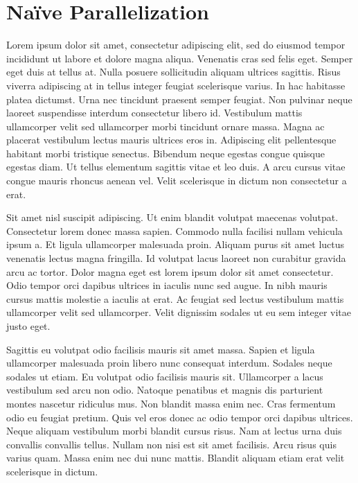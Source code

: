 \documentclass[12pt]{article}
\begin{document}
\newpage


\section{Naïve Parallelization}
Lorem ipsum dolor sit amet, consectetur adipiscing elit, sed do eiusmod tempor incididunt ut labore et dolore magna aliqua. Venenatis cras sed felis eget. Semper eget duis at tellus at. Nulla posuere sollicitudin aliquam ultrices sagittis. Risus viverra adipiscing at in tellus integer feugiat scelerisque varius. In hac habitasse platea dictumst. Urna nec tincidunt praesent semper feugiat. Non pulvinar neque laoreet suspendisse interdum consectetur libero id. Vestibulum mattis ullamcorper velit sed ullamcorper morbi tincidunt ornare massa. Magna ac placerat vestibulum lectus mauris ultrices eros in. Adipiscing elit pellentesque habitant morbi tristique senectus. Bibendum neque egestas congue quisque egestas diam. Ut tellus elementum sagittis vitae et leo duis. A arcu cursus vitae congue mauris rhoncus aenean vel. Velit scelerisque in dictum non consectetur a erat.\par
Sit amet nisl suscipit adipiscing. Ut enim blandit volutpat maecenas volutpat. Consectetur lorem donec massa sapien. Commodo nulla facilisi nullam vehicula ipsum a. Et ligula ullamcorper malesuada proin. Aliquam purus sit amet luctus venenatis lectus magna fringilla. Id volutpat lacus laoreet non curabitur gravida arcu ac tortor. Dolor magna eget est lorem ipsum dolor sit amet consectetur. Odio tempor orci dapibus ultrices in iaculis nunc sed augue. In nibh mauris cursus mattis molestie a iaculis at erat. Ac feugiat sed lectus vestibulum mattis ullamcorper velit sed ullamcorper. Velit dignissim sodales ut eu sem integer vitae justo eget.\par
Sagittis eu volutpat odio facilisis mauris sit amet massa. Sapien et ligula ullamcorper malesuada proin libero nunc consequat interdum. Sodales neque sodales ut etiam. Eu volutpat odio facilisis mauris sit. Ullamcorper a lacus vestibulum sed arcu non odio. Natoque penatibus et magnis dis parturient montes nascetur ridiculus mus. Non blandit massa enim nec. Cras fermentum odio eu feugiat pretium. Quis vel eros donec ac odio tempor orci dapibus ultrices. Neque aliquam vestibulum morbi blandit cursus risus. Nam at lectus urna duis convallis convallis tellus. Nullam non nisi est sit amet facilisis. Arcu risus quis varius quam. Massa enim nec dui nunc mattis. Blandit aliquam etiam erat velit scelerisque in dictum.\par
\end{document}
